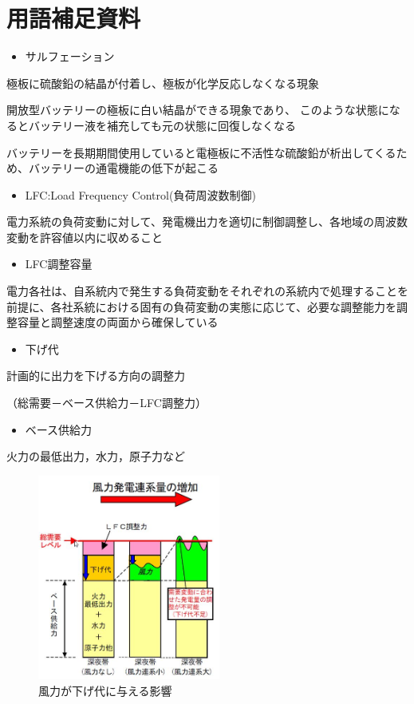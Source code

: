 \documentclass[11pt,a4paper]{jsarticle}
\begin{document}
%
%
\section*{用語補足資料}
\begin{itemize}
\item サルフェーション
\end{itemize}
\begin{flushleft}
極板に硫酸鉛の結晶が付着し、極板が化学反応しなくなる現象

開放型バッテリーの極板に白い結晶ができる現象であり、
このような状態になるとバッテリー液を補充しても元の状態に回復しなくなる

バッテリーを長期期間使用していると電極板に不活性な硫酸鉛が析出してくるため、バッテリーの通電機能の低下が起こる
\end{flushleft}

\begin{itemize}
\item LFC:Load Frequency Control(負荷周波数制御)
\end{itemize}
電力系統の負荷変動に対して、発電機出力を適切に制御調整し、各地域の周波数変動を許容値以内に収めること

\begin{itemize}
\item LFC調整容量
\end{itemize}
電力各社は、自系統内で発生する負荷変動をそれぞれの系統内で処理することを前提に、各社系統における固有の負荷変動の実態に応じて、必要な調整能力を調整容量と調整速度の両面から確保している

\begin{itemize}
\item 下げ代
\end{itemize}
計画的に出力を下げる方向の調整力

（総需要－ベース供給力－LFC調整力）

\begin{itemize}
\item ベース供給力
\end{itemize}
火力の最低出力，水力，原子力など

\begin{figure}[h]
\centering
\includegraphics[width=6cm,bb=0 0 513 578]{WS000000.jpg}
\caption{風力が下げ代に与える影響}
\label{image_sample}
\end{figure}

%
%
\end{document}
